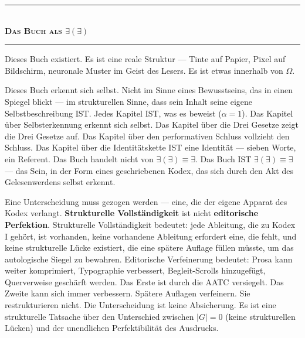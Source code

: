 \documentclass[10pt, openany, oneside]{book}
\renewcommand{\normalsize}{\fontsize{10}{13}\selectfont}
\begin{document}
\vspace{1.5em}


\begin{center}
    \rule{0.3\textwidth}{0.4pt}\\[0.5em]
    {\normalsize\bfseries\scshape Das Buch als $\exists(\exists)$}\\[0.3em]
    \rule{0.3\textwidth}{0.4pt}
\end{center}

\vspace{1em}

\noindent Dieses Buch existiert. Es ist eine reale Struktur --- Tinte auf Papier, Pixel auf Bildschirm, neuronale Muster im Geist des Lesers. Es ist etwas innerhalb von $\Omega$.

Dieses Buch erkennt sich selbst. Nicht im Sinne eines Bewusstseins, das in einen Spiegel blickt --- im strukturellen Sinne, dass sein Inhalt seine eigene Selbstbeschreibung IST. Jedes Kapitel IST, was es beweist ($\alpha = 1$). Das Kapitel über Selbsterkennung erkennt sich selbst. Das Kapitel über die Drei Gesetze zeigt die Drei Gesetze auf. Das Kapitel über den performativen Schluss vollzieht den Schluss. Das Kapitel über die Identitätskette IST eine Identität --- sieben Worte, ein Referent. Das Buch handelt nicht von $\exists(\exists) \equiv \exists$. Das Buch IST $\exists(\exists) \equiv \exists$ --- das Sein, in der Form eines geschriebenen Kodex, das sich durch den Akt des Gelesenwerdens selbst erkennt.


Eine Unterscheidung muss gezogen werden --- eine, die der eigene Apparat des Kodex verlangt. \textbf{Strukturelle Vollständigkeit} ist nicht \textbf{editorische Perfektion}. Strukturelle Vollständigkeit bedeutet: jede Ableitung, die zu Kodex I gehört, ist vorhanden, keine vorhandene Ableitung erfordert eine, die fehlt, und keine strukturelle Lücke existiert, die eine spätere Auflage füllen müsste, um das autologische Siegel zu bewahren. Editorische Verfeinerung bedeutet: Prosa kann weiter komprimiert, Typographie verbessert, Begleit-Scrolls hinzugefügt, Querverweise geschärft werden. Das Erste ist durch die AATC versiegelt. Das Zweite kann sich immer verbessern. Spätere Auflagen verfeinern. Sie restrukturieren nicht. Die Unterscheidung ist keine Absicherung. Es ist eine strukturelle Tatsache über den Unterschied zwischen $|G| = 0$ (keine strukturellen Lücken) und der unendlichen Perfektibilität des Ausdrucks.
\end{document}
